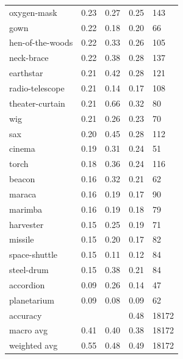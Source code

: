 \begin{center}
\begin{longtable}{lllll}
oxygen-mask & 0.23 & 0.27 & 0.25 & 143 \\
gown & 0.22 & 0.18 & 0.20 & 66 \\
hen-of-the-woods & 0.22 & 0.33 & 0.26 & 105 \\
neck-brace & 0.22 & 0.38 & 0.28 & 137 \\
earthstar & 0.21 & 0.42 & 0.28 & 121 \\
radio-telescope & 0.21 & 0.14 & 0.17 & 108 \\
theater-curtain & 0.21 & 0.66 & 0.32 & 80 \\
wig & 0.21 & 0.26 & 0.23 & 70 \\
sax & 0.20 & 0.45 & 0.28 & 112 \\
cinema & 0.19 & 0.31 & 0.24 & 51 \\
torch & 0.18 & 0.36 & 0.24 & 116 \\
beacon & 0.16 & 0.32 & 0.21 & 62 \\
maraca & 0.16 & 0.19 & 0.17 & 90 \\
marimba & 0.16 & 0.19 & 0.18 & 79 \\
harvester & 0.15 & 0.25 & 0.19 & 71 \\
missile & 0.15 & 0.20 & 0.17 & 82 \\
space-shuttle & 0.15 & 0.11 & 0.12 & 84 \\
steel-drum & 0.15 & 0.38 & 0.21 & 84 \\
accordion & 0.09 & 0.26 & 0.14 & 47 \\
planetarium & 0.09 & 0.08 & 0.09 & 62 \\
\midrule
accuracy &  &  & 0.48 & 18172 \\
macro avg & 0.41 & 0.40 & 0.38 & 18172 \\
weighted avg & 0.55 & 0.48 & 0.49 & 18172 \\
\bottomrule
\end{longtable}
\end{center}
